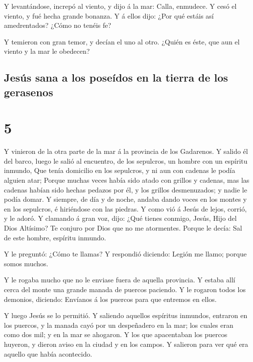  Y levantándose, increpó al viento, y dijo á la mar: Calla,
enmudece. Y cesó el viento, y fué hecha grande bonanza.  Y
á ellos dijo: ¿Por qué estáis así amedrentados? ¿Cómo no tenéis fe?

 Y temieron con gran temor, y decían el uno al otro. ¿Quién
es éste, que aun el viento y la mar le obedecen?

\hypertarget{jesuxfas-sana-a-los-poseuxeddos-en-la-tierra-de-los-gerasenos}{%
\subsection{Jesús sana a los poseídos en la tierra de los
gerasenos}\label{jesuxfas-sana-a-los-poseuxeddos-en-la-tierra-de-los-gerasenos}}

\hypertarget{section-4}{%
\section{5}\label{section-4}}

 Y vinieron de la otra parte de la mar á la provincia de los
Gadarenos.  Y salido él del barco, luego le salió al
encuentro, de los sepulcros, un hombre con un espíritu inmundo,
 Que tenía domicilio en los sepulcros, y ni aun con cadenas
le podía alguien atar;  Porque muchas veces había sido atado
con grillos y cadenas, mas las cadenas habían sido hechas pedazos por
él, y los grillos desmenuzados; y nadie le podía domar.  Y
siempre, de día y de noche, andaba dando voces en los montes y en los
sepulcros, é hiriéndose con las piedras.  Y como vió á Jesús
de lejos, corrió, y le adoró.  Y clamando á gran voz, dijo:
¿Qué tienes conmigo, Jesús, Hijo del Dios Altísimo? Te conjuro por Dios
que no me atormentes.  Porque le decía: Sal de este hombre,
espíritu inmundo.

 Y le preguntó: ¿Cómo te llamas? Y respondió diciendo:
Legión me llamo; porque somos muchos.

 Y le rogaba mucho que no le enviase fuera de aquella
provincia.  Y estaba allí cerca del monte una grande manada
de puercos paciendo.  Y le rogaron todos los demonios,
diciendo: Envíanos á los puercos para que entremos en ellos.

 Y luego Jesús se lo permitió. Y saliendo aquellos
espíritus inmundos, entraron en los puercos, y la manada cayó por un
despeñadero en la mar; los cuales eran como dos mil; y en la mar se
ahogaron.  Y los que apacentaban los puercos huyeron, y
dieron aviso en la ciudad y en los campos. Y salieron para ver qué era
aquello que había acontecido.

